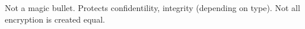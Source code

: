Not a magic bullet. Protects confidentility, integrity (depending on type). Not all encryption is created equal.
